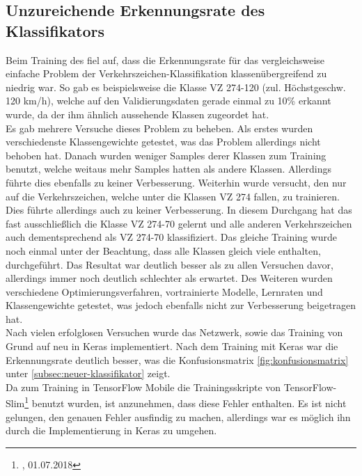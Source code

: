 \documentclass[12pt,a4paper,ngerman,enabledeprecatedfontcommands]{scrreprt}
\begin{document}
\subsection{Unzureichende Erkennungsrate des Klassifikators} 
Beim Training des  fiel auf, dass die Erkennungsrate für das vergleichsweise einfache Problem der Verkehrszeichen-\gls{Klassifikation} klassenübergreifend zu niedrig war. So gab es beispielsweise die Klasse \gls{VZ} 274-120 (zul. Höchstgeschw. 120 km/h), welche auf den Validierungsdaten gerade einmal zu 10\% erkannt wurde, da der  ihm ähnlich aussehende Klassen zugeordet hat.\\
Es gab mehrere Versuche dieses Problem zu beheben. Als erstes wurden verschiedenste Klassengewichte getestet, was das Problem allerdings nicht behoben hat. Danach wurden weniger \gls{Sample}s derer Klassen zum Training benutzt, welche weitaus mehr \gls{Sample}s hatten als andere Klassen. Allerdings führte dies ebenfalls zu keiner Verbesserung. Weiterhin wurde versucht, den  nur auf die Verkehrszeichen, welche unter die Klassen \gls{VZ} 274 fallen, zu trainieren. Dies führte allerdings auch zu keiner Verbesserung. In diesem Durchgang hat das  fast ausschließlich die Klasse \gls{VZ} 274-70 gelernt und alle anderen Verkehrszeichen auch dementsprechend als \gls{VZ} 274-70 klassifiziert. Das gleiche Training wurde noch einmal unter der Beachtung, dass alle Klassen gleich viele  enthalten, durchgeführt. Das Resultat war deutlich besser als zu allen Versuchen davor, allerdings immer noch deutlich schlechter als erwartet. Des Weiteren wurden verschiedene Optimierungsverfahren, vortrainierte Modelle, Lernraten und Klassengewichte getestet, was jedoch ebenfalls nicht zur Verbesserung beigetragen hat.\\
Nach vielen erfolglosen Versuchen wurde das Netzwerk, sowie das Training von Grund auf neu in \gls{Keras} implementiert. Nach dem Training mit \gls{Keras} war die Erkennungsrate deutlich besser, was die Konfusionsmatrix \cref{fig:konfusionsmatrix} unter \cref{subsec:neuer-klassifikator} zeigt. \\
Da zum Training in \gls{TensorFlow Mobile} die Trainingsskripte von TensorFlow-Slim\footnote{, 01.07.2018} benutzt wurden, ist anzunehmen, dass diese Fehler enthalten. Es ist nicht gelungen, den genauen Fehler ausfindig zu machen, allerdings war es möglich ihn durch die Implementierung in \gls{Keras} zu umgehen.
\end{document}
